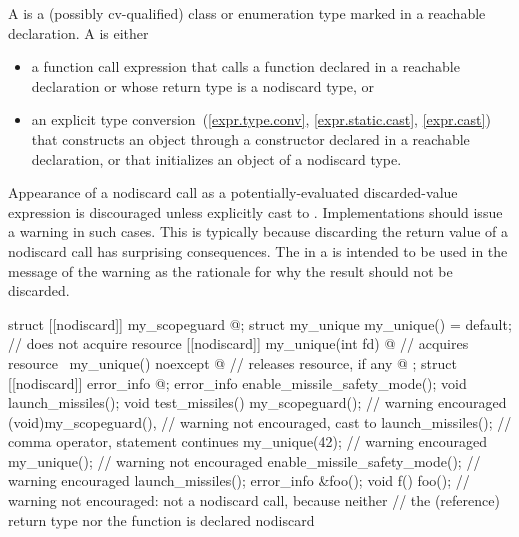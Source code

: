 \pnum
A  is
a (possibly cv-qualified) class or enumeration type
marked  in a reachable declaration.
A  is either
\begin{itemize}
\item
  a function call expression
  that calls a function declared  in a reachable declaration or
  whose return type is a nodiscard type, or
\item
  an explicit type
  conversion~(\ref{expr.type.conv}, \ref{expr.static.cast}, \ref{expr.cast})
  that constructs an object through
  a constructor declared  in a reachable declaration, or
  that initializes an object of a nodiscard type.
\end{itemize}

\pnum
\begin{note}
Appearance of a nodiscard call as
a potentially-evaluated discarded-value expression
is discouraged unless explicitly cast to .
Implementations should issue a warning in such cases.
This is typically because discarding the return value
of a nodiscard call has surprising consequences.
The 
in a  
is intended to be used in the message of the warning
as the rationale for why the result should not be discarded.
\end{note}

\pnum
\begin{example}
\begin{codeblock}
struct [[nodiscard]] my_scopeguard { @\commentellip@ };
struct my_unique {
  my_unique() = default;                                // does not acquire resource
  [[nodiscard]] my_unique(int fd) { @\commentellip@ }         // acquires resource
  ~my_unique() noexcept { @\commentellip@ }                   // releases resource, if any
  @\commentellip@
};
struct [[nodiscard]] error_info { @\commentellip@ };
error_info enable_missile_safety_mode();
void launch_missiles();
void test_missiles() {
  my_scopeguard();              // warning encouraged
  (void)my_scopeguard(),        // warning not encouraged, cast to 
    launch_missiles();          // comma operator, statement continues
  my_unique(42);                // warning encouraged
  my_unique();                  // warning not encouraged
  enable_missile_safety_mode(); // warning encouraged
  launch_missiles();
}
error_info &foo();
void f() { foo(); }             // warning not encouraged: not a nodiscard call, because neither
                                // the (reference) return type nor the function is declared nodiscard
\end{codeblock}
\end{example}

